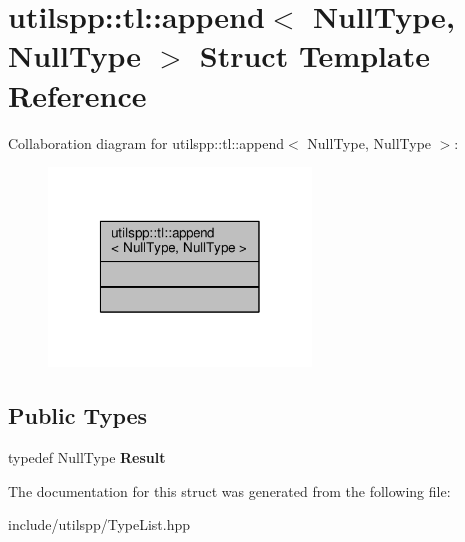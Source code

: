 \hypertarget{structutilspp_1_1tl_1_1append_3_01NullType_00_01NullType_01_4}{\section{utilspp\-:\-:tl\-:\-:append$<$ Null\-Type, Null\-Type $>$ Struct Template Reference}
\label{structutilspp_1_1tl_1_1append_3_01NullType_00_01NullType_01_4}
}


Collaboration diagram for utilspp\-:\-:tl\-:\-:append$<$ Null\-Type, Null\-Type $>$\-:
\nopagebreak
\begin{figure}[H]
\begin{center}
\leavevmode
\includegraphics[width=198pt]{structutilspp_1_1tl_1_1append_3_01NullType_00_01NullType_01_4__coll__graph}
\end{center}
\end{figure}
\subsection*{Public Types}
\begin{DoxyCompactItemize}
\item 
\hypertarget{structutilspp_1_1tl_1_1append_3_01NullType_00_01NullType_01_4_a31a31ee2d8b5e3482cad92a628f8bff7}{typedef Null\-Type {\bfseries Result}}\label{structutilspp_1_1tl_1_1append_3_01NullType_00_01NullType_01_4_a31a31ee2d8b5e3482cad92a628f8bff7}

\end{DoxyCompactItemize}


The documentation for this struct was generated from the following file\-:\begin{DoxyCompactItemize}
\item 
include/utilspp/Type\-List.\-hpp\end{DoxyCompactItemize}

